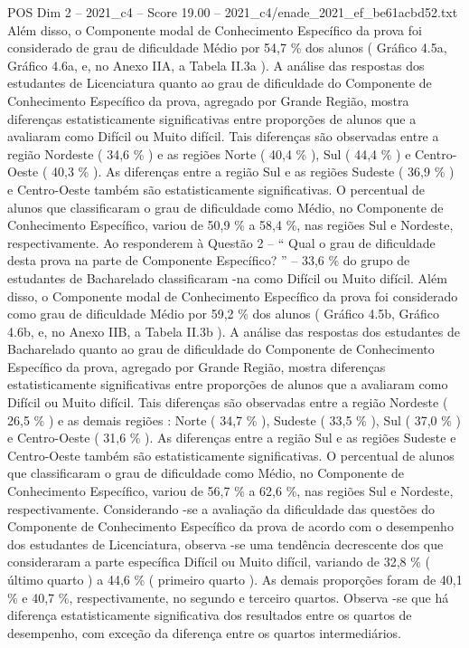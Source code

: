 \begin{textsample}{POS Dim 2 – 2021\_c4 – Score 19.00 – 2021\_c4/enade\_2021\_ef\_be61acbd52.txt}
Além disso, o Componente modal de Conhecimento Específico da prova foi considerado de grau de dificuldade Médio por 54,7 \% dos alunos ( Gráfico 4.5a, Gráfico 4.6a, e, no Anexo IIA, a Tabela II.3a ).
A análise das respostas dos estudantes de Licenciatura quanto ao grau de dificuldade do Componente de Conhecimento Específico da prova, agregado por Grande Região, mostra diferenças estatisticamente significativas entre proporções de alunos que a avaliaram como Difícil ou Muito difícil.
Tais diferenças são observadas entre a região Nordeste ( 34,6 \% ) e as regiões Norte ( 40,4 \% ), Sul ( 44,4 \% ) e Centro-Oeste ( 40,3 \% ).
As diferenças entre a região Sul e as regiões Sudeste ( 36,9 \% ) e Centro-Oeste também são estatisticamente significativas.
O percentual de alunos que classificaram o grau de dificuldade como Médio, no Componente de Conhecimento Específico, variou de 50,9 \% a 58,4 \%, nas regiões Sul e Nordeste, respectivamente.
Ao responderem à Questão 2 – “ Qual o grau de dificuldade desta prova na parte de Componente Específico? ” – 33,6 \% do grupo de estudantes de Bacharelado classificaram -na como Difícil ou Muito difícil.
Além disso, o Componente modal de Conhecimento Específico da prova foi considerado como grau de dificuldade Médio por 59,2 \% dos alunos ( Gráfico 4.5b, Gráfico 4.6b, e, no Anexo IIB, a Tabela II.3b ).
A análise das respostas dos estudantes de Bacharelado quanto ao grau de dificuldade do Componente de Conhecimento Específico da prova, agregado por Grande Região, mostra diferenças estatisticamente significativas entre proporções de alunos que a avaliaram como Difícil ou Muito difícil.
Tais diferenças são observadas entre a região Nordeste ( 26,5 \% ) e as demais regiões : Norte ( 34,7 \% ), Sudeste ( 33,5 \% ), Sul ( 37,0 \% ) e Centro-Oeste ( 31,6 \% ).
As diferenças entre a região Sul e as regiões Sudeste e Centro-Oeste também são estatisticamente significativas.
O percentual de alunos que classificaram o grau de dificuldade como Médio, no Componente de Conhecimento Específico, variou de 56,7 \% a 62,6 \%, nas regiões Sul e Nordeste, respectivamente.
Considerando -se a avaliação da dificuldade das questões do Componente de Conhecimento Específico da prova de acordo com o desempenho dos estudantes de Licenciatura, observa -se uma tendência decrescente dos que consideraram a parte específica Difícil ou Muito difícil, variando de 32,8 \% ( último quarto ) a 44,6 \% ( primeiro quarto ).
As demais proporções foram de 40,1 \% e 40,7 \%, respectivamente, no segundo e terceiro quartos.
Observa -se que há diferença estatisticamente significativa dos resultados entre os quartos de desempenho, com exceção da diferença entre os quartos intermediários.

\end{textsample}
